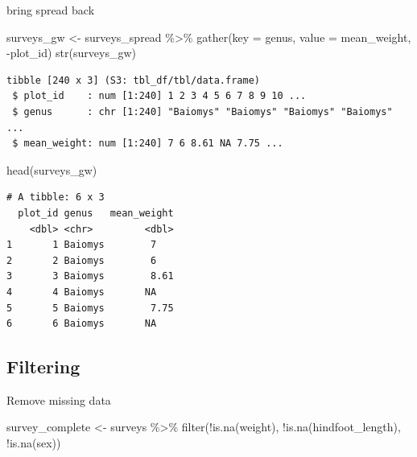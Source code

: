 \documentclass[
  letterpaper,
  DIV=11,
  numbers=noendperiod]{scrreprt}
\newenvironment{Shaded}{\begin{snugshade}}{\end{snugshade}}
\newcommand{\AttributeTok}[1]{\textcolor[rgb]{0.40,0.45,0.13}{#1}}
\newcommand{\FunctionTok}[1]{\textcolor[rgb]{0.28,0.35,0.67}{#1}}
\newcommand{\NormalTok}[1]{\textcolor[rgb]{0.00,0.23,0.31}{#1}}
\newcommand{\OtherTok}[1]{\textcolor[rgb]{0.00,0.23,0.31}{#1}}
\newcommand{\SpecialCharTok}[1]{\textcolor[rgb]{0.37,0.37,0.37}{#1}}
\begin{document}
bring spread back

\begin{Shaded}
\begin{Highlighting}[]
\NormalTok{surveys\_gw }\OtherTok{\textless{}{-}}\NormalTok{ surveys\_spread }\SpecialCharTok{\%\textgreater{}\%}
  \FunctionTok{gather}\NormalTok{(}\AttributeTok{key =}\NormalTok{ genus, }\AttributeTok{value =}\NormalTok{ mean\_weight, }\SpecialCharTok{{-}}\NormalTok{plot\_id)}
\FunctionTok{str}\NormalTok{(surveys\_gw)}
\end{Highlighting}
\end{Shaded}

\begin{verbatim}
tibble [240 x 3] (S3: tbl_df/tbl/data.frame)
 $ plot_id    : num [1:240] 1 2 3 4 5 6 7 8 9 10 ...
 $ genus      : chr [1:240] "Baiomys" "Baiomys" "Baiomys" "Baiomys" ...
 $ mean_weight: num [1:240] 7 6 8.61 NA 7.75 ...
\end{verbatim}

\begin{Shaded}
\begin{Highlighting}[]
\FunctionTok{head}\NormalTok{(surveys\_gw)}
\end{Highlighting}
\end{Shaded}

\begin{verbatim}
# A tibble: 6 x 3
  plot_id genus   mean_weight
    <dbl> <chr>         <dbl>
1       1 Baiomys        7   
2       2 Baiomys        6   
3       3 Baiomys        8.61
4       4 Baiomys       NA   
5       5 Baiomys        7.75
6       6 Baiomys       NA   
\end{verbatim}

\subsection{Filtering}\label{filtering}

Remove missing data

\begin{Shaded}
\begin{Highlighting}[]
\NormalTok{survey\_complete }\OtherTok{\textless{}{-}}\NormalTok{ surveys }\SpecialCharTok{\%\textgreater{}\%}
  \FunctionTok{filter}\NormalTok{(}\SpecialCharTok{!}\FunctionTok{is.na}\NormalTok{(weight), }\SpecialCharTok{!}\FunctionTok{is.na}\NormalTok{(hindfoot\_length), }\SpecialCharTok{!}\FunctionTok{is.na}\NormalTok{(sex))}
\end{Highlighting}
\end{Shaded}
\end{document}
